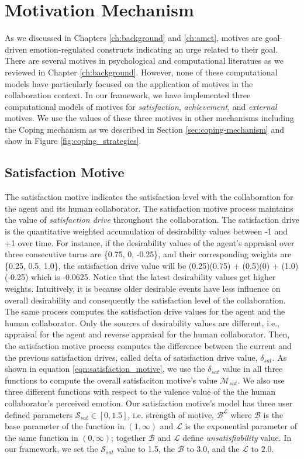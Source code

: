 \documentclass[12pt]{report}
\begin{document}
\section{Motivation Mechanism}
\label{sec:motivation_mechanism}
As we discussed in Chapters \ref{ch:background} and \ref{ch:amct}, motives are
goal-driven emotion-regulated constructs indicating an urge related to their
goal. There are several motives in psychological and computational literatues
as we reviewed in Chapter \ref{ch:background}. However, none of these
computational models have particularly focused on the application of motives in
the collaboration context. In our framework, we have implemented three
computational models of motives for \textit{satisfaction}, \textit{achievement},
and \textit{external} motives. We use the values of these three motives in other
mechanisms including the Coping mechanism as we described in Section
\ref{sec:coping-mechanism} and show in Figure \ref{fig:coping_strategies}.

\subsection{Satisfaction Motive}
The satisfaction motive indicates the satisfaction level with the collaboration
for the agent and its human collaborator. The satisfaction motive process maintains
the value of \textit{satisfaction drive} throughout the collaboration. The
satisfaction drive is the quantitative weighted accumulation of desirability
values between -1 and +1 over time. For instance, if the desirability values of
the agent's appraisal over three consecutive turns are \{0.75, 0, -0.25\}, and
their corresponding weights are \{0.25, 0.5, 1.0\}, the satisfaction drive value
will be (0.25)(0.75) + (0.5)(0) + (1.0)(-0.25) which is -0.0625. Notice that
the latest desirability values get higher weights. Intuitively, it is because
older desirable events have less influence on overall desirability and
consequently the satisfaction level of the collaboration. The same process
computes the satisfaction drive values for the agent and the human collaborator.
Only the sources of desirability values are different, i.e., appraisal for the
agent and reverse appraisal for the human collaborator. Then, the satisfaction
motive process computes the difference between the current and the previous
satisfaction drives, called delta of satisfaction drive value, $\delta_{sat}$.
As shown in equation \ref{eqn:satisfaction_motive}, we use the $\delta_{sat}$
value in all three functions to compute the overall satisfaciton motive's value
$\mathcal{M}_{sat}$. We also use three different functions with respect to the
valence value of the the human collaborator's perceived emotion. Our
satisfaction motive's model has three user defined parameters $\mathcal{S}_{sat}
\in [0, 1.5]$, i.e. strength of motive, $\mathcal{B}^\mathcal{L}$ where
$\mathcal{B}$ is the base parameter of the function in $(1,\infty)$ and
$\mathcal{L}$ is the exponential parameter of the same function in $(0,
\infty)$; together $\mathcal{B}$ and $\mathcal{L}$ define
\textit{unsatisfiability} value. In our framework, we set the
$\mathcal{S}_{sat}$ value to 1.5, the $\mathcal{B}$ to 3.0, and the
$\mathcal{L}$ to 2.0.
\end{document}
